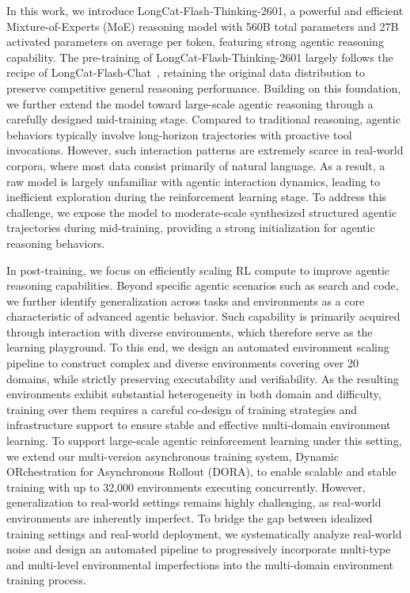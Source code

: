 \documentclass{article}
\newcommand{\longcat}{LongCat-Flash-Thinking-2601\xspace}
\begin{document}
In this work, we introduce \longcat, a powerful and efficient Mixture-of-Experts (MoE) reasoning model with 560B total parameters and 27B activated parameters on average per token, featuring strong agentic reasoning capability.
The pre-training of \longcat largely follows the recipe of LongCat-Flash-Chat~\citep{longcat-flash}, retaining the original data distribution to preserve competitive general reasoning performance.
Building on this foundation, we further extend the model toward large-scale agentic reasoning through a carefully designed mid-training stage.
Compared to traditional reasoning, agentic behaviors typically involve long-horizon trajectories with proactive tool invocations.
However, such interaction patterns are extremely scarce in real-world corpora, where most data consist primarily of natural language.
As a result, a raw model is largely unfamiliar with agentic interaction dynamics, leading to inefficient exploration during the reinforcement learning stage.
To address this challenge, we expose the model to moderate-scale synthesized structured agentic trajectories during mid-training, providing a strong initialization for agentic reasoning behaviors.

In post-training, we focus on efficiently scaling RL compute to improve agentic reasoning capabilities.
Beyond specific agentic scenarios such as search and code, we further identify generalization across tasks and environments as a core characteristic of advanced agentic behavior.
Such capability is primarily acquired through interaction with diverse environments, which therefore serve as the learning playground.
To this end, we design an automated environment scaling pipeline to construct complex and diverse environments covering over 20 domains, while strictly preserving executability and verifiability.
As the resulting environments exhibit substantial heterogeneity in both domain and difficulty, training over them requires a careful co-design of training strategies and infrastructure support to ensure stable and effective multi-domain environment learning.
To support large-scale agentic reinforcement learning under this setting, we extend our multi-version asynchronous training system, Dynamic ORchestration for Asynchronous Rollout (DORA), to enable scalable and stable training with up to 32,000 environments executing concurrently.
However, generalization to real-world settings remains highly challenging, as real-world environments are inherently imperfect.
To bridge the gap between idealized training settings and real-world deployment, we systematically analyze real-world noise and design an automated pipeline to progressively incorporate multi-type and multi-level environmental imperfections into the multi-domain environment training process.
\end{document}
